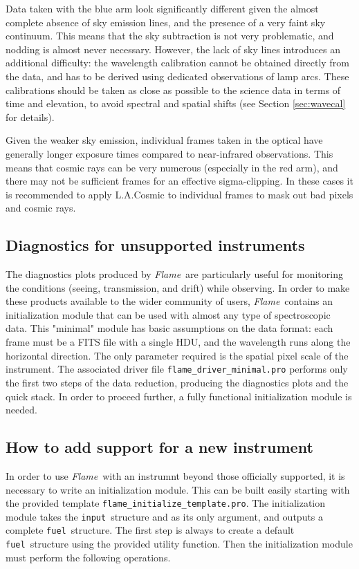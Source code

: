 \documentclass[a4paper]{article}
\newcommand{\flame}{\emph{Flame}}
\newcommand{\fuel}{\texttt{fuel}}
\newcommand{\inp}{\texttt{input}}
\begin{document}
\begin{sloppypar}
Data taken with the blue arm look significantly different given the almost complete absence of sky emission lines, and the presence of a very faint sky continuum. This means that the sky subtraction is not very problematic, and nodding is almost never necessary. However, the lack of sky lines introduces an additional difficulty: the wavelength calibration cannot be obtained directly from the data, and has to be derived using dedicated observations of lamp arcs. These calibrations should be taken as close as possible to the science data in terms of time and elevation, to avoid spectral and spatial shifts (see Section \ref{sec:wavecal} for details).

Given the weaker sky emission, individual frames taken in the optical have generally longer exposure times compared to near-infrared observations. This means that cosmic rays can be very numerous (especially in the red arm), and there may not be sufficient frames for an effective sigma-clipping. In these cases it is recommended to apply L.A.Cosmic to individual frames to mask out bad pixels and cosmic rays.


\subsection{Diagnostics for unsupported instruments}
\label{sec:minimal}

The diagnostics plots produced by \flame\ are particularly useful for monitoring the conditions (seeing, transmission, and drift) while observing. In order to make these products available to the wider community of users, \flame\ contains an initialization module that can be used with almost any type of spectroscopic data. This "minimal" module has basic assumptions on the data format: each frame must be a FITS file with a single HDU, and the wavelength runs along the horizontal direction. The only parameter required is the spatial pixel scale of the instrument. The associated driver file \texttt{flame\_driver\_minimal.pro} performs only the first two steps of the data reduction, producing the diagnostics plots and the quick stack. In order to proceed further, a fully functional initialization module is needed.

\subsection{How to add support for a new instrument}

In order to use \flame\ with an instrumnt beyond those officially supported, it is necessary to write an initialization module. This can be built easily starting with the provided template \texttt{flame\_initialize\_template.pro}. The initialization module takes the \inp\ structure and as its only argument, and outputs a complete \fuel\ structure. The first step is always to create a default \fuel\ structure using the provided utility function. Then the initialization module must perform the following operations.


\end{sloppypar}
\end{document}
